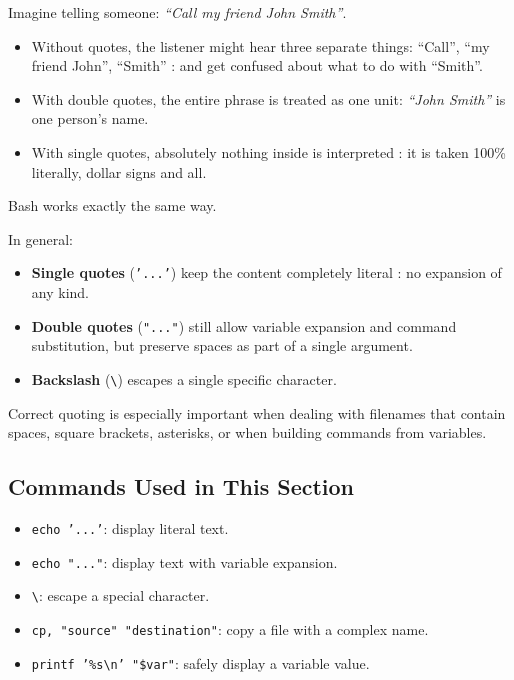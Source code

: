 \begin{examplebox}
  Imagine telling someone: \textit{``Call my friend John Smith''}.
  \begin{itemize}
    \item Without quotes, the listener might hear three separate things:
      ``Call'', ``my friend John'', ``Smith'' : and get confused about what
      to do with ``Smith''.
    \item With double quotes, the entire phrase is treated as one unit:
      \textit{``John Smith''} is one person's name.
    \item With single quotes, absolutely nothing inside is interpreted : it is
      taken 100\% literally, dollar signs and all.
  \end{itemize}
  Bash works exactly the same way.
\end{examplebox}

In general:
\begin{itemize}
  \item \textbf{Single quotes} (\texttt{'...'}) keep the content completely
    literal : no expansion of any kind.
  \item \textbf{Double quotes} (\texttt{"..."}) still allow variable
    expansion and command substitution, but preserve spaces as part of a
    single argument.
  \item \textbf{Backslash} (\texttt{\textbackslash}) escapes a single
    specific character.
\end{itemize}

Correct quoting is especially important when dealing with filenames that
contain spaces, square brackets, asterisks, or when building commands from
variables.

\subsection*{Commands Used in This Section}

\begin{itemize}
  \item \texttt{echo '...'}: display literal text.
  \item \texttt{echo "..."}: display text with variable expansion.
  \item \texttt{\textbackslash}: escape a special character.
  \item \texttt{cp, "source" "destination"}: copy a file with a complex name.
  \item \texttt{printf '\%s\textbackslash n' "\$var"}: safely display a variable value.
\end{itemize}

